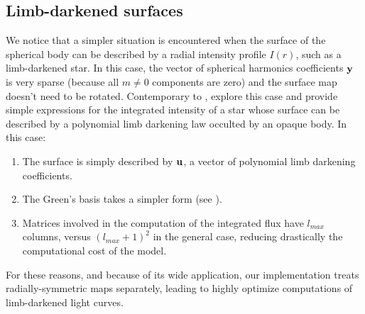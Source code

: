 \documentclass[modern]{aastex631}
\begin{document}
\subsection{Limb-darkened surfaces}
We notice that a simpler situation is encountered when the surface of the spherical body can be described by a radial intensity profile $I(r)$, such as a limb-darkened star. In this case, the vector of spherical harmonics coefficients ${\mathbf{y}}$ is very sparse (because all $m\neq0$ components are zero) and the surface map doesn't need to be rotated. Contemporary to \cite{starry}, \cite{Agol2020} explore this case and provide simple expressions for the integrated intensity of a star whose surface can be described by a polynomial limb darkening law occulted by an opaque body. In this case:
\begin{enumerate}
    \item The surface is simply described by ${\mathbf{u}}$, a vector of polynomial limb darkening coefficients.
    \item The Green's basis takes a simpler form (see \citealt[Equation 14]{Agol2020}).
    \item Matrices involved in the computation of the integrated flux have $l_{max}$ columns, versus $(l_{max}+1)^2$ in the general case, reducing drastically the computational cost of the model.
\end{enumerate}
For these reasons, and because of its wide application, our implementation treats radially-symmetric maps separately, leading to highly optimize computations of limb-darkened light curves.\\\\


\newpage
\end{document}
